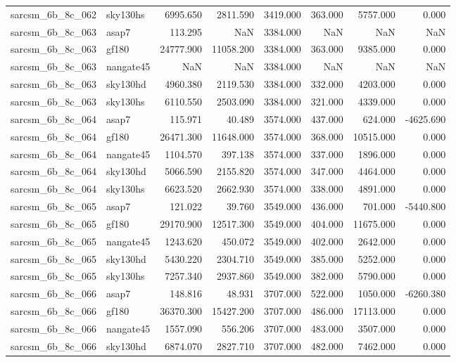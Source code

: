 \begin{tabular}{llrrrrrr}
sarcsm\_6b\_8c\_062 & sky130hs & 6995.650 & 2811.590 & 3419.000 & 363.000 & 5757.000 & 0.000 \\
sarcsm\_6b\_8c\_063 & asap7 & 113.295 & NaN & 3384.000 & NaN & NaN & NaN \\
sarcsm\_6b\_8c\_063 & gf180 & 24777.900 & 11058.200 & 3384.000 & 363.000 & 9385.000 & 0.000 \\
sarcsm\_6b\_8c\_063 & nangate45 & NaN & NaN & 3384.000 & NaN & NaN & NaN \\
sarcsm\_6b\_8c\_063 & sky130hd & 4960.380 & 2119.530 & 3384.000 & 332.000 & 4203.000 & 0.000 \\
sarcsm\_6b\_8c\_063 & sky130hs & 6110.550 & 2503.090 & 3384.000 & 321.000 & 4339.000 & 0.000 \\
sarcsm\_6b\_8c\_064 & asap7 & 115.971 & 40.489 & 3574.000 & 437.000 & 624.000 & -4625.690 \\
sarcsm\_6b\_8c\_064 & gf180 & 26471.300 & 11648.000 & 3574.000 & 368.000 & 10515.000 & 0.000 \\
sarcsm\_6b\_8c\_064 & nangate45 & 1104.570 & 397.138 & 3574.000 & 337.000 & 1896.000 & 0.000 \\
sarcsm\_6b\_8c\_064 & sky130hd & 5066.590 & 2155.820 & 3574.000 & 347.000 & 4464.000 & 0.000 \\
sarcsm\_6b\_8c\_064 & sky130hs & 6623.520 & 2662.930 & 3574.000 & 338.000 & 4891.000 & 0.000 \\
sarcsm\_6b\_8c\_065 & asap7 & 121.022 & 39.760 & 3549.000 & 436.000 & 701.000 & -5440.800 \\
sarcsm\_6b\_8c\_065 & gf180 & 29170.900 & 12517.300 & 3549.000 & 404.000 & 11675.000 & 0.000 \\
sarcsm\_6b\_8c\_065 & nangate45 & 1243.620 & 450.072 & 3549.000 & 402.000 & 2642.000 & 0.000 \\
sarcsm\_6b\_8c\_065 & sky130hd & 5430.220 & 2304.710 & 3549.000 & 385.000 & 5252.000 & 0.000 \\
sarcsm\_6b\_8c\_065 & sky130hs & 7257.340 & 2937.860 & 3549.000 & 382.000 & 5790.000 & 0.000 \\
sarcsm\_6b\_8c\_066 & asap7 & 148.816 & 48.931 & 3707.000 & 522.000 & 1050.000 & -6260.380 \\
sarcsm\_6b\_8c\_066 & gf180 & 36370.300 & 15427.200 & 3707.000 & 486.000 & 17113.000 & 0.000 \\
sarcsm\_6b\_8c\_066 & nangate45 & 1557.090 & 556.206 & 3707.000 & 483.000 & 3507.000 & 0.000 \\
sarcsm\_6b\_8c\_066 & sky130hd & 6874.070 & 2827.710 & 3707.000 & 482.000 & 7462.000 & 0.000 \\

\end{tabular}
